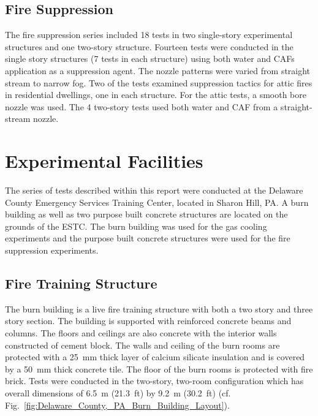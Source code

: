 \documentclass[12pt,oneside]{book}
\begin{document}
\subsection{Fire Suppression}
\label{sec:desc_Fire_Suppression}

The fire suppression series included 18 tests in two single-story experimental structures and one two-story structure. Fourteen tests were conducted in the single story structures (7 tests in each structure) using both water and CAFs application as a suppression agent. The nozzle patterns were varied from straight stream to narrow fog. Two of the tests examined suppression tactics for attic fires in residential dwellings, one in each structure. For the attic tests, a smooth bore nozzle was used. The 4 two-story tests used both water and CAF from a straight-stream nozzle.

\section{Experimental Facilities}
\label{sec:Experimental_Facility}

The series of tests described within this report were conducted at the Delaware County Emergency Services Training Center, located in Sharon Hill, PA. A burn building as well as two purpose built concrete structures are located on the grounds of the ESTC. The burn building was used for the gas cooling experiments and the purpose built concrete structures were used for the fire suppression experiments.

\subsection{Fire Training Structure}
\label{sec:Burn_Building}

The burn building is a live fire training structure with both a two story and three story section. The building is supported with reinforced concrete beams and columns. The floors and ceilings are also concrete with the interior walls constructed of cement block. The walls and ceiling of the burn rooms are protected with a 25~mm thick layer of calcium silicate insulation and is covered by a 50~mm thick concrete tile. The floor of the burn rooms is protected with fire brick. Tests were conducted in the two-story, two-room configuration which has overall dimensions of 6.5~m (21.3~ft) by 9.2~m (30.2~ft) (cf. Fig.~\ref{fig:Delaware_County,_PA_Burn_Building_Layout}).
\end{document}
